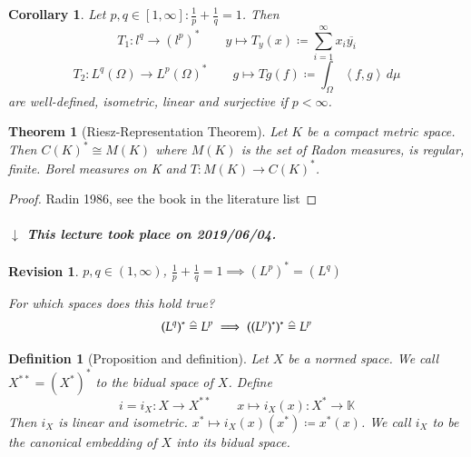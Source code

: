 \documentclass[a4paper]{article}
\newcounter{lecref}[section]
\numberwithin{lecref}{section}
\newtheorem{theorem}[lecref]{Theorem}
\newtheorem{definition}[lecref]{Definition}
\newtheorem{corollary}[lecref]{Corollary}
\newtheorem{revision}[lecref]{Revision}
\newcommand{\IP}[2]{\left\langle#1, #2\right\rangle}
\newcommand\correspondsto{\mathrel{\stackon[1.5pt]{=}{\stretchto{%
    \scalerel*[\widthof{=}]{\wedge}{\rule{1ex}{3ex}}}{0.5ex}}}}
\newcommand{\dateref}[1]{%
  \begin{mdframed}[backgroundcolor=gray!10,innerbottommargin=0pt,innertopmargin=0pt]
    \paragraph{\textit{$\downarrow$ This lecture took place on #1.}}%
  \end{mdframed}%
}
\begin{document}
\begin{corollary}
	\label{corollary:6.8}
	Let $p, q \in [1, \infty]: \frac1p + \frac1q = 1$. Then
	\[ T_1: l^q \to (l^p)^* \qquad y \mapsto T_y(x) \coloneqq \sum_{i=1}^\infty x_i \overline{y_i} \]
	\[ T_2: L^q(\Omega) \to L^p(\Omega)^* \qquad g \mapsto Tg(f) \coloneqq \int_{\Omega} \IP fg \, d\mu \]
	are well-defined, isometric, linear and surjective if $p < \infty$.
\end{corollary}


\begin{theorem}[Riesz-Representation Theorem]
	\label{theorem:6.9}
	Let $K$ be a compact metric space. Then
	$C(K)^* \cong M(K)$ where $M(K)$ is the set of Radon measures, is regular, finite. Borel measures on K and $T: M(K) \to C(K)^*$.
\end{theorem}

\begin{proof}
	Radin 1986, see the book in the literature list
\end{proof}

\dateref{2019/06/04}

\begin{revision}
	$p, q \in (1, \infty)$, $\frac1p + \frac1q = 1 \implies (L^p)^* = (L^q)$

	For which spaces does this hold true?
	\[ (L^q)^* \correspondsto L^p \implies ((L^p)^{*})^* \correspondsto L^p \]
\end{revision}

\begin{definition}[Proposition and definition]
	\label{definition:6.10}
	Let $X$ be a normed space. We call $X^{**} = (X^*)^*$ to the \emph{bidual space} of $X$. Define
	\[ i = i_X: X \to X^{**} \qquad x \mapsto i_X(x): X^* \to \mathbb K \]
	Then $i_X$ is linear and isometric. $x^* \mapsto i_X(x)(x^*) \coloneqq x^*(x)$.
	We call $i_X$ to be the \emph{canonical embedding} of $X$ into its bidual space.
\end{definition}
\end{document}
